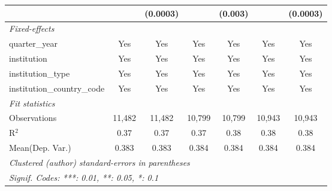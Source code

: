 \begin{tabular}{lcccccc}
                                      &             & (0.0003)    &              & (0.003)      &             & (0.0003)\\   
   \midrule
   \emph{Fixed-effects}\\
   quarter\_year                      & Yes         & Yes         & Yes          & Yes          & Yes         & Yes\\  
   institution                        & Yes         & Yes         & Yes          & Yes          & Yes         & Yes\\  
   institution\_type                  & Yes         & Yes         & Yes          & Yes          & Yes         & Yes\\  
   institution\_country\_code         & Yes         & Yes         & Yes          & Yes          & Yes         & Yes\\  
   \midrule
   \emph{Fit statistics}\\
   Observations                       & 11,482      & 11,482      & 10,799       & 10,799       & 10,943      & 10,943\\  
   R$^2$                              & 0.37        & 0.37        & 0.37         & 0.38         & 0.38        & 0.38\\  
Mean(Dep. Var.) & 0.383 & 0.383 & 0.384 & 0.384 & 0.384 & 0.384 \\
   \midrule \midrule
   \multicolumn{7}{l}{\emph{Clustered (author) standard-errors in parentheses}}\\
   \multicolumn{7}{l}{\emph{Signif. Codes: ***: 0.01, **: 0.05, *: 0.1}}\\
\end{tabular}
\par\endgroup
